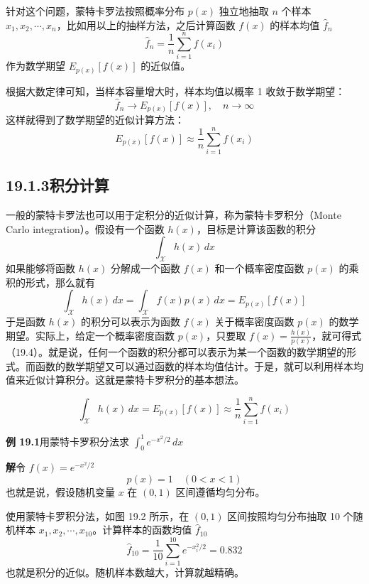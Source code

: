 \documentclass[UTF8, 12pt, fontset=fandol, oneside]{ctexart}
\begin{document}
针对这个问题，蒙特卡罗法按照概率分布 $p(x)$ 独立地抽取 $n$ 个样本 $x_1,x_2,\cdots,x_n$，比如用以上的抽样方法，之后计算函数 $f(x)$ 的样本均值 $\hat f_n$
\begin{equation}
\hat f_n=\frac{1}{n}\sum_{i=1}^n f(x_i)
\tag{19.1}
\end{equation}
作为数学期望 $E_{p(x)}[f(x)]$ 的近似值。

根据大数定律可知，当样本容量增大时，样本均值以概率 1 收敛于数学期望：
\begin{equation}
\hat f_n\to E_{p(x)}[f(x)],\quad n\to\infty
\tag{19.2}
\end{equation}
这样就得到了数学期望的近似计算方法：
\begin{equation}
E_{p(x)}[f(x)]\approx \frac{1}{n}\sum_{i=1}^n f(x_i)
\tag{19.3}
\end{equation}

\subsection*{19.1.3\quad 积分计算}

一般的蒙特卡罗法也可以用于定积分的近似计算，称为蒙特卡罗积分（Monte Carlo integration）。假设有一个函数 $h(x)$，目标是计算该函数的积分
\[
\int_{\mathcal{X}} h(x)\,dx
\]
如果能够将函数 $h(x)$ 分解成一个函数 $f(x)$ 和一个概率密度函数 $p(x)$ 的乘积的形式，那么就有
\begin{equation}
\int_{\mathcal{X}} h(x)\,dx=\int_{\mathcal{X}} f(x)p(x)\,dx=E_{p(x)}[f(x)]
\tag{19.4}
\end{equation}
于是函数 $h(x)$ 的积分可以表示为函数 $f(x)$ 关于概率密度函数 $p(x)$ 的数学期望。实际上，给定一个概率密度函数 $p(x)$，只要取 $f(x)=\frac{h(x)}{p(x)}$，就可得式（19.4）。就是说，任何一个函数的积分都可以表示为某一个函数的数学期望的形式。而函数的数学期望又可以通过函数的样本均值估计。于是，就可以利用样本均值来近似计算积分。这就是蒙特卡罗积分的基本想法。

\begin{equation}
\int_{\mathcal{X}} h(x)\,dx=E_{p(x)}[f(x)]\approx \frac{1}{n}\sum_{i=1}^n f(x_i)
\tag{19.5}
\end{equation}

\noindent\textbf{例 19.1}\quad 用蒙特卡罗积分法求 $\displaystyle\int_0^1 e^{-x^2/2}\,dx$

\noindent\textbf{解}\quad 令 $f(x)=e^{-x^2/2}$
\[
p(x)=1\quad (0<x<1)
\]
也就是说，假设随机变量 $x$ 在 $(0,1)$ 区间遵循均匀分布。

使用蒙特卡罗积分法，如图 19.2 所示，在 $(0,1)$ 区间按照均匀分布抽取 10 个随机样本 $x_1,x_2,\cdots,x_{10}$。计算样本的函数均值 $\hat f_{10}$
\[
\hat f_{10}=\frac{1}{10}\sum_{i=1}^{10}e^{-x_i^2/2}=0.832
\]
也就是积分的近似。随机样本数越大，计算就越精确。
\end{document}
